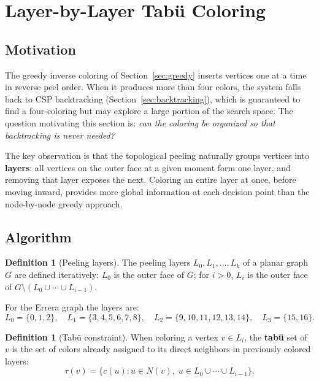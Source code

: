 \documentclass[12pt,letterpaper]{article}
\theoremstyle{plain}
\theoremstyle{definition}
\newtheorem{definition}[theorem]{Definition}
\theoremstyle{remark}
\begin{document}
\section{Layer-by-Layer Tab\"{u} Coloring}
\label{sec:tabu}

\subsection{Motivation}

The greedy inverse coloring of Section~\ref{sec:greedy} inserts vertices one at
a time in reverse peel order. When it produces more than four colors, the system
falls back to CSP backtracking (Section~\ref{sec:backtracking}), which is
guaranteed to find a four-coloring but may explore a large portion of the search
space. The question motivating this section is: \emph{can the coloring be
organized so that backtracking is never needed?}

The key observation is that the topological peeling naturally groups vertices
into \textbf{layers}: all vertices on the outer face at a given moment form one
layer, and removing that layer exposes the next. Coloring an entire layer at
once, before moving inward, provides more global information at each decision
point than the node-by-node greedy approach.

\subsection{Algorithm}

\begin{definition}[Peeling layers]
The peeling layers $L_0, L_1, \ldots, L_k$ of a planar graph $G$ are defined
iteratively: $L_0$ is the outer face of $G$; for $i > 0$, $L_i$ is the outer
face of $G \setminus (L_0 \cup \cdots \cup L_{i-1})$.
\end{definition}

For the Errera graph the layers are:
\[
    L_0 = \{0,1,2\}, \quad
    L_1 = \{3,4,5,6,7,8\}, \quad
    L_2 = \{9,10,11,12,13,14\}, \quad
    L_3 = \{15,16\}.
\]

\begin{definition}[Tab\"{u} constraint]
When coloring a vertex $v \in L_i$, the \textbf{tab\"{u}} set of $v$ is the set
of colors already assigned to its direct neighbors in previously colored layers:
\begin{equation}
    \tau(v) = \{c(u) : u \in N(v),\; u \in L_0 \cup \cdots \cup L_{i-1}\}.
    \label{eq:tabu}
\end{equation}
\end{definition}
\end{document}
